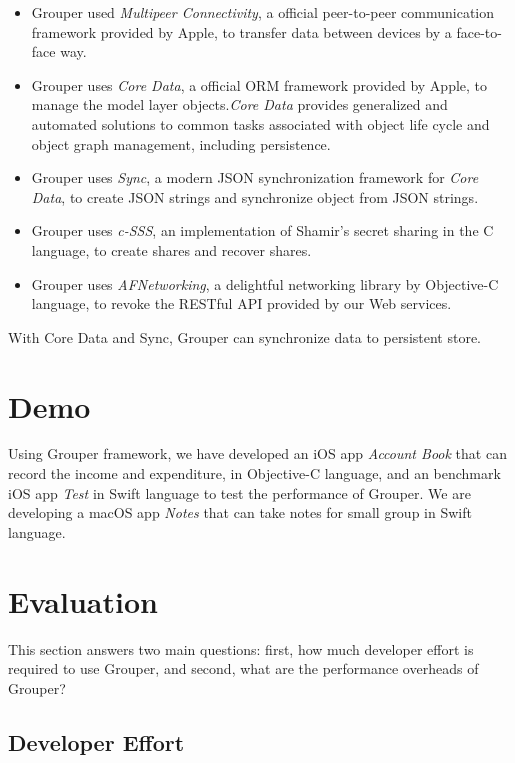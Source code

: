 \documentclass[twocolumn,10pt]{article}
\begin{document}
\begin{itemize}
	\setlength{\itemsep}{1pt}
	\setlength{\parskip}{0pt}
	\setlength{\parsep}{0pt}
	\item Grouper used \emph{Multipeer Connectivity}\cite{mc},  a official peer-to-peer communication framework provided by Apple, to transfer data between devices by a face-to-face way.
	\item Grouper uses \emph{Core Data}\cite{coredata}, a official ORM framework provided by Apple, to manage the model layer objects.\emph{Core Data} provides generalized and automated solutions to common tasks associated with object life cycle and object graph management, including persistence.
	\item Grouper uses \emph{Sync}\cite{sync}, a modern JSON synchronization framework for \emph{Core Data}, to create JSON strings and synchronize object from JSON strings.
	\item Grouper uses \emph{c-SSS}\cite{c-sss}, an implementation of Shamir's secret sharing in the C language, to create shares and recover shares.
	\item Grouper uses \emph{AFNetworking}\cite{afnetworking}, a delightful networking library by Objective-C language, to revoke the RESTful API provided by our Web services. 
\end{itemize}

With {Core Data} and {Sync}, Grouper can synchronize data to persistent store.

\section{Demo}
Using Grouper framework, we have developed an iOS app \emph{Account Book} that can record the income and expenditure, in Objective-C language, and an benchmark iOS app \emph{Test} in Swift language to test the performance of Grouper. We are developing a macOS app \emph{Notes} that can take notes for small group in Swift language.

\section{Evaluation}

This section answers two main questions:  first, how much developer effort is required to use Grouper, and second, what are the performance overheads of Grouper?

\subsection{Developer Effort}
\end{document}
